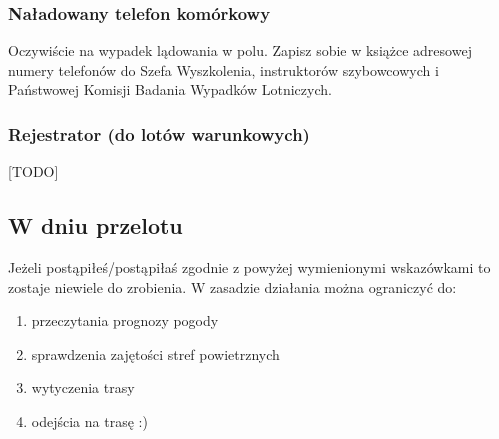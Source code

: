 \documentclass{article}
\begin{document}
\subsubsection{Naładowany telefon komórkowy}
Oczywiście na wypadek lądowania w polu. Zapisz sobie w książce adresowej
numery telefonów do Szefa Wyszkolenia, instruktorów szybowcowych i 
Państwowej Komisji Badania Wypadków Lotniczych.

\subsubsection{Rejestrator (do lotów warunkowych)}
[TODO] %

\subsection{W dniu przelotu}
Jeżeli postąpiłeś/postąpiłaś zgodnie z powyżej wymienionymi wskazówkami to
zostaje niewiele do zrobienia. W zasadzie działania można ograniczyć do:
\begin{enumerate}
\item przeczytania prognozy pogody
\item sprawdzenia zajętości stref powietrznych
\item wytyczenia trasy
\item odejścia na trasę :)
\end{enumerate}
\end{document}
